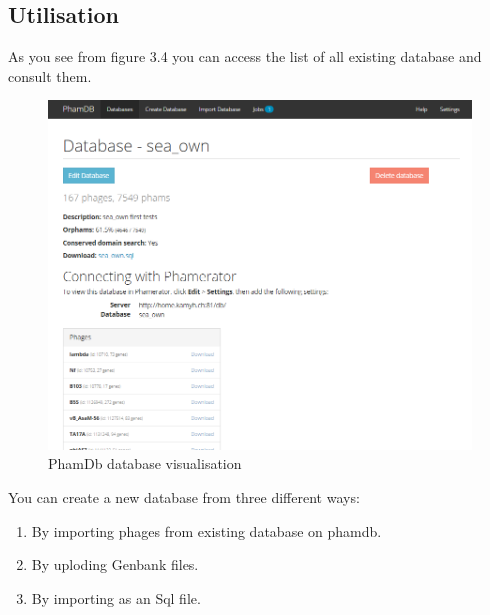 \documentclass[a4paper,11pt]{report}
\begin{document}
\subsection{Utilisation}
As you see from figure 3.4 you can access the list of all existing database and consult them.

\begin{figure}[H] 
	\begin{center}
		\includegraphics[scale=0.45]{img/phamdb_see_db}
		\caption{PhamDb database visualisation}
	\end{center}
\end{figure}

You can create a new database from three different ways:
\begin{enumerate}
	\item By importing phages from existing database on phamdb.
	\item By uploding Genbank files.
	\item By importing as an Sql file.
\end{enumerate}
\end{document}
